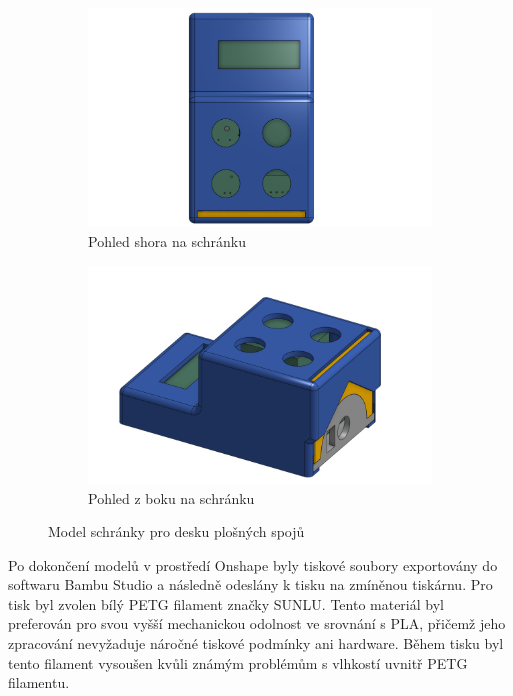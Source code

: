 \begin{figure}[hptb]
	\centering
	\begin{subfigure}[t]{0.48\textwidth}
		\includegraphics[width=\textwidth]{images/krabickaTop.png}
		\caption{Pohled shora na schránku}
		\label{fig:krabickaTop}
	\end{subfigure}%
	\hfill
	\begin{subfigure}[t]{0.48\textwidth}
		\includegraphics[width=\textwidth]{images/KrabickaZBoku.png}
		\caption{Pohled z boku na schránku}
		\label{fig:KrabickaZBoku}
	\end{subfigure}
	\caption{Model schránky pro desku plošných spojů}
	\label{fig:krabickaObaPohledy}
\end{figure}

Po dokončení modelů v prostředí Onshape byly tiskové soubory exportovány do softwaru Bambu Studio a následně odeslány k tisku na zmíněnou tiskárnu. Pro tisk byl zvolen bílý PETG filament značky SUNLU. Tento materiál byl preferován pro svou vyšší mechanickou odolnost ve srovnání s PLA, přičemž jeho zpracování nevyžaduje náročné tiskové podmínky ani hardware. Během tisku byl tento filament vysoušen kvůli známým problémům s vlhkostí uvnitř PETG filamentu.

